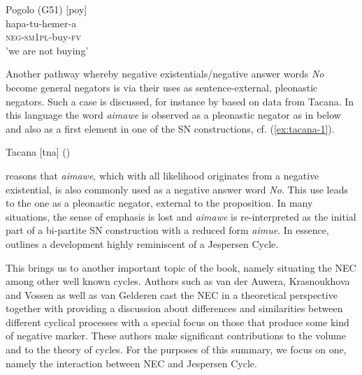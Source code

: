 \documentclass[output=paper,chinesefont,colorlinks,citecolor=brown]{langscibook}
\begin{document}
\begin{exe}
\ex Pogolo (G51) [poy] \label{ex:pogolo1}\\
\gll hapa-tu-hemer-a\\
	\textsc{neg-sm1pl}-buy-\textsc{fv}\\
\glt 'we are not buying'
\end{exe}

Another pathway whereby negative existentials/negative answer words \textit{No} become general negators is via their uses as sentence-external, pleonastic negators. Such a case is discussed, for instance by  based on data from Tacana. In this language the word \textit{aimawe} is observed as a pleonastic negator as in  below and also as a first element in one of the SN constructions, cf. (\ref{ex:tacana-1}).

\begin{exe}
\ex Tacana [tna] () \label{ex:tacana2}
\end{exe}
 reasons that \textit{aimawe}, which with all likelihood originates from a negative existential, is also commonly used as a negative answer word \textit{No}. This use leads to the one as a pleonastic negator, external to the proposition. In many situations, the sense of emphasis is lost and \textit{aimawe} is re-interpreted as the initial part of a bi-partite SN construction with a reduced form \textit{aimue}. In essence,  outlines a development highly reminiscent of a Jespersen Cycle.

This brings us to another important topic of the book, namely situating the NEC among other well known cycles. Authors such as van der Auwera, Krasnoukhova and Vossen as well as van Gelderen cast the NEC in a theoretical perspective together with providing a discussion about differences and similarities between different cyclical processes with a special focus on those that produce some kind of negative marker. These authors make significant contributions to the volume and to the theory of cycles. For the purposes of this summary, we focus on one, namely the interaction between NEC and Jespersen Cycle.
\end{document}
